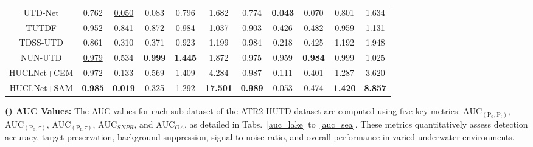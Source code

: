 \begin{table*}[!t]
{\begin{tabular}{ccccccccccc}
                                    UTD-Net     & 0.762          & \underline{0.050}          & 0.083          & 0.796          & 1.682           & 0.774          & \textbf{0.043} & 0.070          & 0.801          & 1.634          \\
                                    TUTDF       & 0.952          & 0.841          & 0.872          & 0.984          & 1.037           & 0.903          & 0.426          & 0.482          & 0.959          & 1.131          \\
                                    TDSS-UTD    & 0.861          & 0.310          & 0.371          & 0.923          & 1.199           & 0.984          & 0.218          & 0.425          & 1.192          & 1.948          \\
                                    NUN-UTD     & \underline{0.979}    & 0.534          & \textbf{0.999} & \textbf{1.445} & 1.872           & 0.975          & 0.959          & \textbf{0.984} & 0.999          & 1.025          \\
            \rowcolor{tablecolor13!60}HUCLNet+CEM & 0.972          & 0.133          & 0.569          & \underline{1.409}    & \underline{4.284}     & \underline{0.987}    & 0.111          & 0.401          & \underline{1.287}    & \underline{3.620}    \\
            \rowcolor{tablecolor14!60}HUCLNet+SAM & \textbf{0.985} & \textbf{0.019} & 0.325          & 1.292          & \textbf{17.501} & \textbf{0.989} & \underline{0.053}    & 0.474          & \textbf{1.420} & \textbf{8.857} \\ \hline
        \end{tabular}}
\end{table*}
\textbf{() AUC Values:} The AUC values for each sub-dataset of the ATR2-HUTD dataset are computed using five key metrics: $\text{AUC}_{( \mathrm{P}_{\mathrm{d}}, \mathrm{P}_{\mathrm{f}})}$, $\text{AUC}_{( \mathrm{P}_{\mathrm{d}}, \tau)}$, $\text{AUC}_{( \mathrm{P}_{\mathrm{f}}, \tau)}$, $\text{AUC}_{SNPR}$, and $\text{AUC}_{OA}$, as detailed in Tabs.~\ref{auc_lake} to~\ref{auc_sea}. These metrics quantitatively assess detection accuracy, target preservation, background suppression, signal-to-noise ratio, and overall performance in varied underwater environments.
\par
